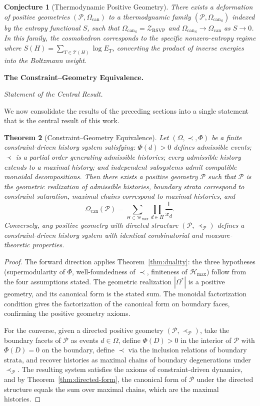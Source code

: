 \documentclass[11pt]{article}
\theoremstyle{plain}
\newtheorem{theorem}{Theorem}[section]
\newtheorem{conjecture}[theorem]{Conjecture}
\theoremstyle{definition}
\theoremstyle{remark}
\newcommand{\Phif}{\Phi}
\newcommand{\Sf}{S}
\newcommand{\OmKS}{\Omega}
\newcommand{\CF}{\Omega_{\mathrm{can}}}
\newcommand{\ZRSVP}{\mathcal{Z}_{\mathrm{RSVP}}}
\newcommand{\Hmax}{\mathcal{H}_{\max}}
\begin{document}
\begin{conjecture}[Thermodynamic Positive Geometry]
There exists a deformation of positive geometries $(\mathcal{P}, \CF)$ to a thermodynamic family $(\mathcal{P}, \CF_{\Sf})$ indexed by the entropy functional $\Sf$, such that $\CF_{\Sf} = \ZRSVP$ and $\CF_{\Sf} \to \CF$ as $\Sf \to 0$. In this family, the cosmohedron corresponds to the specific nonzero-entropy regime where $\Sf(H) = \sum_{T \in \mathcal{T}(H)} \log E_T$, converting the product of inverse energies into the Boltzmann weight.
\end{conjecture}

\bigskip\noindent\textbf{The Constraint--Geometry Equivalence.}
\label{sec:master}

\medskip\noindent\textit{Statement of the Central Result.}

We now consolidate the results of the preceding sections into a single statement that is the central result of this work.

\begin{theorem}[Constraint--Geometry Equivalence]
\label{thm:master}
Let $(\OmKS, \prec, \Phif)$ be a finite constraint-driven history system satisfying: $\Phif(d) > 0$ defines admissible events; $\prec$ is a partial order generating admissible histories; every admissible history extends to a maximal history; and independent subsystems admit compatible monoidal decompositions. Then there exists a positive geometry $\mathcal{P}$ such that $\mathcal{P}$ is the geometric realization of admissible histories, boundary strata correspond to constraint saturation, maximal chains correspond to maximal histories, and
\[
  \CF(\mathcal{P}) = \sum_{H \in \Hmax} \prod_{d \in H} \frac{1}{x_d}.
\]
Conversely, any positive geometry with directed structure $(\mathcal{P}, \prec_{\mathcal{P}})$ defines a constraint-driven history system with identical combinatorial and measure-theoretic properties.
\end{theorem}

\begin{proof}
The forward direction applies Theorem~\ref{thm:duality}: the three hypotheses (supermodularity of $\Phif$, well-foundedness of $\prec$, finiteness of $\Hmax$) follow from the four assumptions stated. The geometric realization $|\OmKS^*|$ is a positive geometry, and its canonical form is the stated sum. The monoidal factorization condition gives the factorization of the canonical form on boundary faces, confirming the positive geometry axioms.

For the converse, given a directed positive geometry $(\mathcal{P}, \prec_{\mathcal{P}})$, take the boundary facets of $\mathcal{P}$ as events $d \in \OmKS$, define $\Phif(D) > 0$ in the interior of $\mathcal{P}$ with $\Phif(D) = 0$ on the boundary, define $\prec$ via the inclusion relations of boundary strata, and recover histories as maximal chains of boundary degenerations under $\prec_{\mathcal{P}}$. The resulting system satisfies the axioms of constraint-driven dynamics, and by Theorem~\ref{thm:directed-form}, the canonical form of $\mathcal{P}$ under the directed structure equals the sum over maximal chains, which are the maximal histories.
\end{proof}
\end{document}
